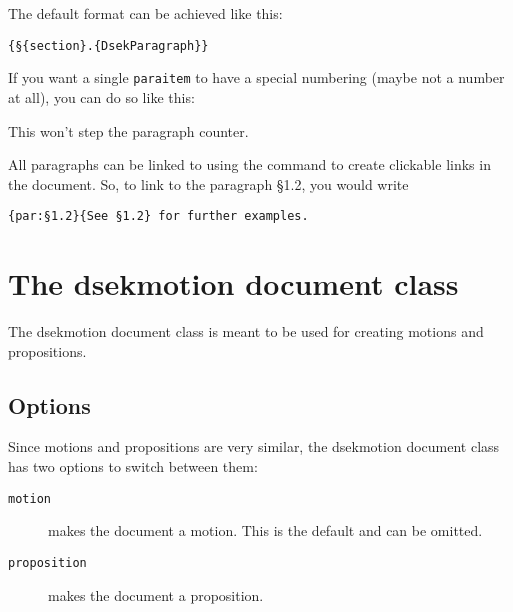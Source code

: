 \documentclass[a4paper, oneside]{ltxdoc}
\begin{document}
\begin{center}
\end{center}

The default format can be achieved like this:

\begin{center}
  \texttt{\{§\{section\}.\{DsekParagraph\}\}}
\end{center}

If you want a single \texttt{paraitem} to have a special numbering (maybe not a
number at all), you can do so like this:

\begin{center}
\end{center}

This won't step the paragraph counter.

All paragraphs can be linked to using the  command to create
clickable links in the document.  So, to link to the paragraph §1.2, you would
write

\begin{center}
  \texttt{\{par:§1.2\}\{See §1.2\} for further examples.}
\end{center}

\section{The \textsf{dsekmotion} document class}
The \textsf{dsekmotion} document class is meant to be used for creating
motions and propositions.

\subsection{Options}
Since motions and propositions are very similar, the \textsf{dsekmotion}
document class has two options to switch between them:
\begin{description}
  \item[\texttt{motion}] makes the document a motion. This is the default and can be omitted.
  \item[\texttt{proposition}] makes the document a proposition.
\end{description}
\end{document}
